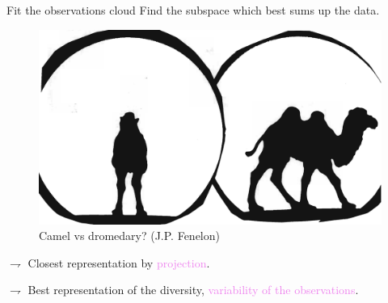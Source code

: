 \documentclass[9pt]{beamer}
\begin{document}
\begin{frame}{Fit the observations cloud}
Find the \textcolor{lighto}{subspace which best sums up the data}.

\begin{figure}[H]
\begin{center}
\includegraphics[scale=.3]{./cham3.pdf}
\caption{Camel vs dromedary? \tiny{(J.P. Fenelon})}
\end{center}
\end{figure}
\vfill
$\rightharpoondown$  Closest representation by \textcolor{violet}{projection}.

$\rightharpoondown$  Best representation of the diversity, \textcolor{violet}{variability of the observations}.

\end{frame}
\end{document}
